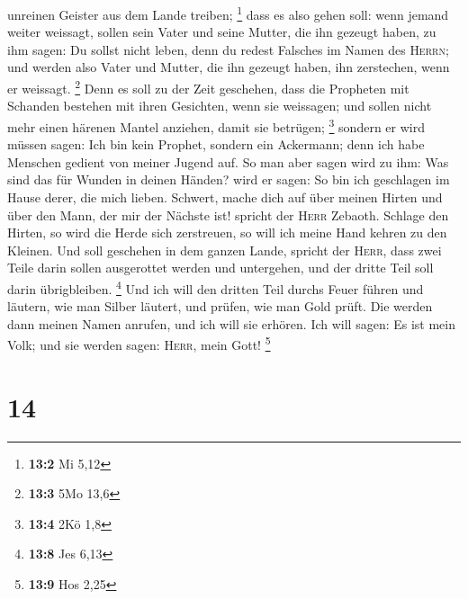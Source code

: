 unreinen Geister aus dem Lande treiben; \footnote{\textbf{13:2} Mi 5,12}
 dass es also gehen soll: wenn jemand weiter weissagt,
sollen sein Vater und seine Mutter, die ihn gezeugt haben, zu ihm sagen:
Du sollst nicht leben, denn du redest Falsches im Namen des
\textsc{Herrn}; und werden also Vater und Mutter, die ihn gezeugt haben,
ihn zerstechen, wenn er weissagt. \footnote{\textbf{13:3} 5Mo 13,6}
 Denn es soll zu der Zeit geschehen, dass die Propheten
mit Schanden bestehen mit ihren Gesichten, wenn sie weissagen; und
sollen nicht mehr einen härenen Mantel anziehen, damit sie betrügen;
\footnote{\textbf{13:4} 2Kö 1,8}  sondern er wird müssen
sagen: Ich bin kein Prophet, sondern ein Ackermann; denn ich habe
Menschen gedient von meiner Jugend auf.  So man aber sagen
wird zu ihm: Was sind das für Wunden in deinen Händen? wird er sagen: So
bin ich geschlagen im Hause derer, die mich lieben. 
Schwert, mache dich auf über meinen Hirten und über den Mann, der mir
der Nächste ist! spricht der \textsc{Herr} Zebaoth. Schlage den Hirten,
so wird die Herde sich zerstreuen, so will ich meine Hand kehren zu den
Kleinen.  Und soll geschehen in dem ganzen Lande, spricht
der \textsc{Herr}, dass zwei Teile darin sollen ausgerottet werden und
untergehen, und der dritte Teil soll darin übrigbleiben. \footnote{\textbf{13:8}
  Jes 6,13}  Und ich will den dritten Teil durchs Feuer
führen und läutern, wie man Silber läutert, und prüfen, wie man Gold
prüft. Die werden dann meinen Namen anrufen, und ich will sie erhören.
Ich will sagen: Es ist mein Volk; und sie werden sagen: \textsc{Herr},
mein Gott! \footnote{\textbf{13:9} Hos 2,25}

\hypertarget{section-6}{%
\section{14}\label{section-6}}

